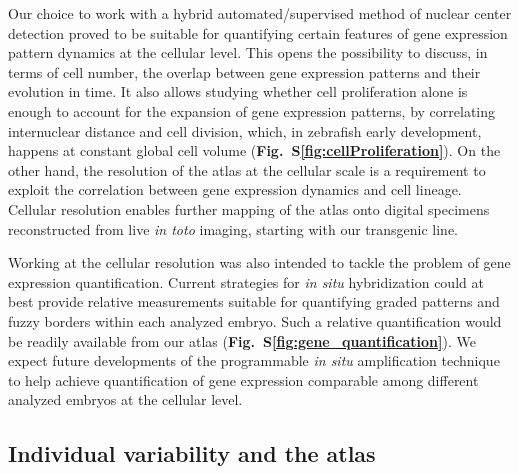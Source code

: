 Our choice to work with a hybrid automated/supervised method of nuclear center detection proved to be suitable for quantifying certain features of gene expression pattern dynamics at the cellular level. This opens the possibility to discuss, in terms of cell number, the overlap between gene expression patterns and their evolution in time. It also allows studying whether cell proliferation alone is enough to account for the expansion of gene expression patterns, by correlating internuclear distance and cell division, which, in zebrafish early development, happens at constant global cell volume (\textbf{Fig.~S\ref{fig:cellProliferation}}). On the other hand, the resolution of the atlas at the cellular scale is a requirement to exploit the correlation between gene expression dynamics and cell lineage. Cellular resolution enables further mapping of the atlas onto digital specimens reconstructed from live \emph{in toto} imaging, starting with our transgenic line.



Working at the cellular resolution was also intended to tackle the problem of gene expression quantification. Current strategies for \emph{in situ} hybridization could at best provide relative measurements suitable for quantifying graded patterns and fuzzy borders within each analyzed embryo. Such a relative quantification would be readily available from our atlas (\textbf{Fig.~S\ref{fig:gene_quantification}}). We expect future developments of the programmable \emph{in situ} amplification technique\cite{choi2010} to help achieve quantification of gene expression comparable among different analyzed embryos at the cellular level.



\subsection*{Individual variability and the atlas}



